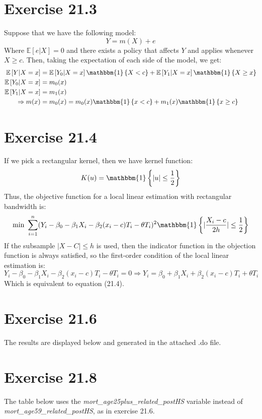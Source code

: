 \documentclass{article}
\newcommand{\usmin}[1]{\underset{#1}{\text{min }}}
\newcommand{\one}[1]{\mathbbm{1}\left\{#1\right\}}
\newcommand{\E}[1]{\mathbb{E}\left[#1\right]}%
\begin{document}

\section*{Exercise 21.3}
Suppose that we have the following model:
\[
	Y = m(X) + e 
\]
Where $\E{e|X}=0$ and there exists a policy that affects $Y$ and applies whenever ${X\geq c}$. Then, taking the expectation of each side of the model, we get:
\begin{align*}
			\E{Y|X=x} 	&= \E{Y_0|X=x}\one{X<c} + \E{Y_1|X=x}\one{X\geq x}	\\
			\E{Y_0|X=x}	&= m_0(x) \\ \E{Y_1|X=x} &= m_1(x)					\\
	\Rightarrow m(x)	&= m_0(x) = m_0(x)\one{x<c} + m_1(x)\one{x\geq c}
\end{align*}


\section*{Exercise 21.4}
If we pick a rectangular kernel, then we have kernel function:
\[
	K(u) = \one{|u|\leq\frac{1}{2}}
\]
Thus, the objective function for a local linear estimation with rectangular bandwidth is:
\[
	\usmin{}\sum_{i=1}^n(Y_i-\beta_0-\beta_1X_i-\beta_2(x_i-c)T_i-\theta T_i)^2\one{|\frac{X_i-c}{2h}|\leq\frac{1}{2}}
\]
If the subsample $|X-C|\leq h$ is used, then the indicator function in the objection function is always satisfied, so the first-order condition of the local linear estimation is:
\[
	Y_i-\beta_0-\beta_1X_i-\beta_2(x_i-c)T_i-\theta T_i = 0 \Rightarrow Y_i = \beta_0+\beta_1X_i+\beta_2(x_i-c)T_i+\theta T_i
\]
Which is equivalent to equation (21.4).



\section*{Exercise 21.6}
The results are displayed below and generated in the attached .do file.
\begin{center}
	
\end{center}


\section*{Exercise 21.8}
The table below uses the \textit{mort\_age25plus\_related\_postHS} variable instead of \textit{mort\_age59\_related\_postHS}, as in exercise 21.6.
\begin{center}
	
\end{center}


\end{document}
